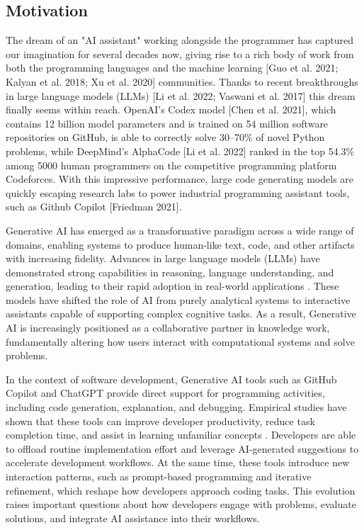 \subsection{Motivation}
The dream of an "AI assistant" working alongside the programmer has captured our imagination for several decades now, giving rise to a rich body of work from both the programming languages \cite{ferdowsifard2021LooPy,miltner2019edit,raychev2014code} and the machine learning [Guo et al. 2021; Kalyan et al. 2018; Xu et al. 2020] communities. Thanks to recent breakthroughs in large language models (LLMs) [Li et al. 2022; Vaswani et al. 2017] this dream finally seems within reach. OpenAI’s Codex model [Chen et al. 2021], which contains 12 billion model parameters and is trained on 54 million software repositories on GitHub, is able to correctly solve 30–70\% of novel Python problems, while DeepMind's AlphaCode [Li et al. 2022] ranked in the top 54.3\% among 5000 human programmers on the competitive programming platform Codeforces. With this impressive performance, large code generating models are quickly escaping research labs to power industrial programming assistant tools, such as Github Copilot [Friedman 2021].

Generative AI has emerged as a transformative paradigm across a wide range of domains, enabling systems to produce human-like text, code, and other artifacts with increasing fidelity. Advances in large language models (LLMs) have demonstrated strong capabilities in reasoning, language understanding, and generation, leading to their rapid adoption in real-world applications \cite{brown2020gpt3, bommasani2021foundation}. These models have shifted the role of AI from purely analytical systems to interactive assistants capable of supporting complex cognitive tasks. As a result, Generative AI is increasingly positioned as a collaborative partner in knowledge work, fundamentally altering how users interact with computational systems and solve problems.

In the context of software development, Generative AI tools such as GitHub Copilot and ChatGPT provide direct support for programming activities, including code generation, explanation, and debugging. Empirical studies have shown that these tools can improve developer productivity, reduce task completion time, and assist in learning unfamiliar concepts \cite{peng2023copilot, vaithilingam2022expectation, kazemitabaar2023copilot}. Developers are able to offload routine implementation effort and leverage AI-generated suggestions to accelerate development workflows. At the same time, these tools introduce new interaction patterns, such as prompt-based programming and iterative refinement, which reshape how developers approach coding tasks. This evolution raises important questions about how developers engage with problems, evaluate solutions, and integrate AI assistance into their workflows.

